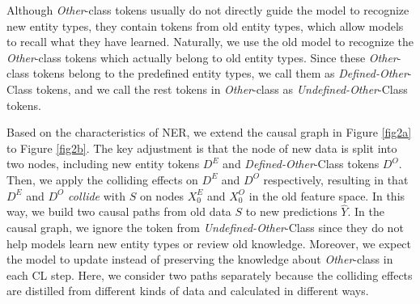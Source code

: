 \documentclass[11pt]{article}
\begin{document}
Although \textit{Other}-class tokens usually do not directly guide the model to recognize new entity types, they contain tokens from old entity types, which allow models to recall what they have learned.
Naturally, we use the old model to recognize the \textit{Other}-class tokens which actually belong to old entity types.
Since these \textit{Other}-class tokens belong to the predefined entity types, we call them as \textit{Defined-Other}-Class tokens, and we call the rest tokens in \textit{Other}-class as \textit{Undefined-Other}-Class tokens.

Based on the characteristics of NER, we extend the causal graph in Figure \ref{fig2a} to Figure \ref{fig2b}.
The key adjustment is that the node of new data is split into two nodes, including new entity tokens $D^E$ and \textit{Defined-Other}-Class tokens $D^O$.
Then, we apply the colliding effects on $D^E$ and $D^O$ respectively, resulting in that $D^E$ and $D^O$ \textit{collide} with $S$ on nodes $X_0^E$ and $X_0^O$ in the old feature space.
In this way, we build two causal paths from old data $S$ to new predictions $\hat{Y}$.
In the causal graph, we ignore the token from \textit{Undefined-Other}-Class since they do not help models learn new entity types or review old knowledge.
Moreover, we expect the model to update instead of preserving the knowledge about \textit{Other}-class in each CL step. 
Here, we consider two paths separately because the colliding effects are distilled from different kinds of data and calculated in different ways.
\end{document}
